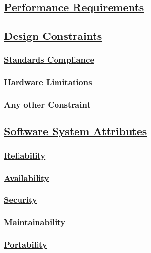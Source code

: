		
	
	
\subsection[Performance Requirements]{\hyperlink{toc}{Performance Requirements}}

\subsection[Design Constraints]{\hyperlink{toc}{Design Constraints}}
	\subsubsection[Standards Compliance]{\hyperlink{toc}{Standards Compliance}}
	\subsubsection[Hardware Limitations]{\hyperlink{toc}{Hardware Limitations}}
	\subsubsection[Any other Constraint]{\hyperlink{toc}{Any other Constraint}}

\subsection[Software System Attributes]{\hyperlink{toc}{Software System Attributes}}
	\subsubsection[Reliability]{\hyperlink{toc}{Reliability}}
	\subsubsection[Availability]{\hyperlink{toc}{Availability}}
	\subsubsection[Security]{\hyperlink{toc}{Security}}
	\subsubsection[Maintainability]{\hyperlink{toc}{Maintainability}}
	\subsubsection[Portability]{\hyperlink{toc}{Portability}}
